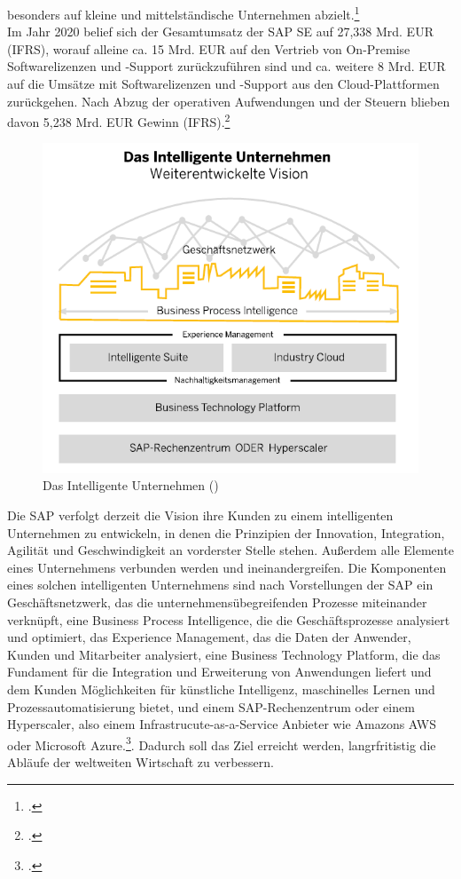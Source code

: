 besonders auf kleine und mittelständische Unternehmen abzielt.\footcite[Vgl.][]{sap-historie}\\ Im Jahr 2020 belief sich der Gesamtumsatz der SAP SE auf 27,338 Mrd. EUR (IFRS), worauf alleine ca. 15 Mrd. EUR auf den Vertrieb von \glqq{}On-Premise\grqq{} Softwarelizenzen und -Support zurückzuführen sind und ca. weitere 8 Mrd. EUR auf die Umsätze mit Softwarelizenzen und -Support aus den Cloud-Plattformen zurückgehen. Nach Abzug der operativen Aufwendungen und der Steuern blieben davon 5,238 Mrd. EUR Gewinn (IFRS).\footcite[Vgl.][S. 142]{sap2020-report} 

\begin{figure}[h!]
    \centering
    \includegraphics[scale=1]{Bilder/SAPIntelligentesUnternehmen.png}
    \caption[Das Intelligente Unternehmen]{Das Intelligente Unternehmen (\cite[][S. 53]{sap2020-report})}
\end{figure}

Die SAP verfolgt derzeit die Vision ihre Kunden zu einem intelligenten Unternehmen zu entwickeln, in denen die Prinzipien der Innovation, Integration, Agilität und Geschwindigkeit an vorderster Stelle stehen. Außerdem alle Elemente eines Unternehmens verbunden werden und ineinandergreifen. Die Komponenten eines solchen intelligenten Unternehmens sind nach Vorstellungen der SAP ein Geschäftsnetzwerk, das die unternehmensübegreifenden Prozesse miteinander verknüpft, eine Business Process Intelligence, die die Geschäftsprozesse analysiert und optimiert, das Experience Management, das die Daten der Anwender, Kunden und Mitarbeiter analysiert, eine Business Technology Platform, die das Fundament für die Integration und Erweiterung von Anwendungen liefert und dem Kunden Möglichkeiten für künstliche Intelligenz, maschinelles Lernen und Prozessautomatisierung bietet, und einem SAP-Rechenzentrum oder einem Hyperscaler, also einem Infrastrucute-as-a-Service Anbieter wie Amazons AWS oder Microsoft Azure.\footcite[Vgl.][S. 53 f.]{sap2020-report}. Dadurch soll das Ziel erreicht werden, langrfritistig die Abläufe der weltweiten Wirtschaft zu verbessern.


